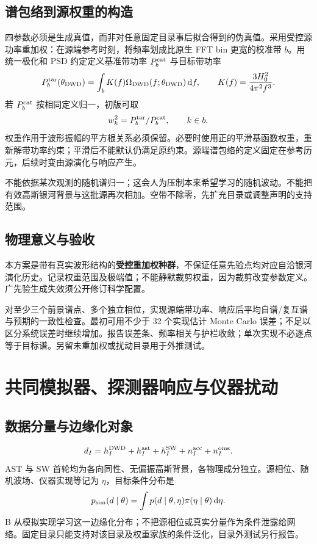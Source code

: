 \documentclass[UTF8,fontset=none,a4paper,11pt]{ctexart}
\newcommand{\dd}{\mathrm d}\newcommand{\GB}{\mathrm{DWD}}\newcommand{\AST}{\mathrm{ast}}\newcommand{\SW}{\mathrm{SW}}
\newcommand{\chapterpage}[1]{\section{#1}}
\begin{document}
\subsection{谱包络到源权重的构造}
四参数必须是生成真值，而非对任意固定目录事后拟合得到的伪真值。采用受控源功率重加权：在源端参考时刻，将频率划成比原生 FFT bin 更宽的校准带 $b$。用统一极化和 PSD 约定定义基准带功率 $P_b^{\rm cat}$ 与目标带功率
\begin{equation}
P_b^{\rm tar}(\theta_{\GB})=\int_b K(f)\Omega_{\GB}(f;\theta_{\GB})\,\dd f,
\qquad K(f)=\frac{3H_0^2}{4\pi^2f^3}.
\end{equation}
若 $P_b^{\rm cat}$ 按相同定义归一，初版可取
\begin{equation}
w_k^2=P_b^{\rm tar}/P_b^{\rm cat},\qquad k\in b.
\end{equation}
权重作用于波形振幅的平方根关系必须保留。必要时使用正的平滑基函数权重，重新解带功率约束；平滑后不能默认仍满足原约束。源端谱包络的定义固定在参考历元，后续时变由源演化与响应产生。
\par 不能依据某次观测的随机谱归一；这会人为压制本来希望学习的随机波动。不能把有效高斯银河背景与这批源再次相加。空带不除零，先扩充目录或调整声明的支持范围。
\subsection{物理意义与验收}
本方案是带有真实波形结构的\textbf{受控重加权种群}，不保证任意先验点均对应自洽银河演化历史。记录权重范围及极端值；不能静默裁剪权重，因为裁剪改变参数定义。广先验生成失效须公开修订科学配置。
\par 对至少三个前景谱点、多个独立相位，实现源端带功率、响应后平均自谱/复互谱与预期的一致性检查。最初可用不少于 32 个实现估计 Monte Carlo 误差；不足以区分系统误差时继续增加。报告误差条、频率相关与护栏收敛；单次实现不必逐点等于目标谱。另留未重加权或扰动目录用于外推测试。
\chapterpage{共同模拟器、探测器响应与仪器扰动}
\subsection{数据分量与边缘化对象}
\begin{equation}
d_I=h_I^{\GB}+h_I^{\AST}+h_I^{\SW}+n_I^{\rm acc}+n_I^{\rm oms}.
\end{equation}
AST 与 SW 首轮均为各向同性、无偏振高斯背景，各物理成分独立。源相位、随机波场、仪器实现等记为 $\eta$，目标条件分布是
\begin{equation}
p_{\rm sim}(d\mid\theta)=\int p(d\mid\theta,\eta)\pi(\eta\mid\theta)\,\dd\eta.
\end{equation}
B 从模拟实现学习这一边缘化分布；不把源相位或真实分量作为条件泄露给网络。固定目录只能支持对该目录及权重家族的条件泛化，目录外测试另行报告。
\end{document}
